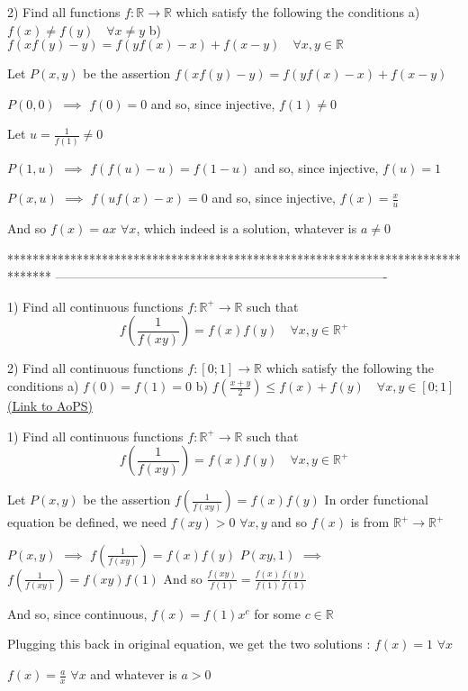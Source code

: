 \begin{solution}
	\begin{tcolorbox}2)  Find all functions $f:\mathbb{R}\to\mathbb{R}$  which satisfy the following the conditions 
a) $f(x)\neq f(y) \quad \forall x\neq y$
b) $f(xf(y)-y)=f(yf(x)-x)+f(x-y) \quad \forall x,y \in \mathbb{R}$\end{tcolorbox}
Let $P(x,y)$ be the assertion $f(xf(y)-y)=f(yf(x)-x)+f(x-y)$

$P(0,0)$ $\implies$ $f(0)=0$ and so, since injective, $f(1)\ne 0$

Let $u=\frac 1{f(1)}\ne 0$

$P(1,u)$ $\implies$ $f(f(u)-u)=f(1-u)$ and so, since injective, $f(u)=1$

$P(x,u)$ $\implies$ $f(uf(x)-x)=0$ and so, since injective, $f(x)=\frac xu$

And so $\boxed{f(x)=ax}$ $\forall x$, which indeed is a solution, whatever is $a\ne 0$
\end{solution}
*******************************************************************************
-------------------------------------------------------------------------------

\begin{problem}
	1) Find all continuous functions $f:\mathbb{R}^+\to\mathbb{R}$  such that
\[f\left(\frac{1}{f(xy)}\right) =f(x)f(y) \quad \forall x,y \in \mathbb{R}^+\]

2) Find all continuous functions $f:[0;1]\to\mathbb{R}$  which satisfy the following the conditions
a) $f(0)=f(1)=0$
b) $f\left(\frac{x+y}{2} \right) \leq f(x)+f(y) \quad \forall x,y \in [0;1]$
	\flushright \href{https://artofproblemsolving.com/community/c6h563604}{(Link to AoPS)}
\end{problem}



\begin{solution}
	\begin{tcolorbox}1) Find all continuous functions $f:\mathbb{R}^+\to\mathbb{R}$  such that
\[f\left(\frac{1}{f(xy)}\right) =f(x)f(y) \quad \forall x,y \in \mathbb{R}^+\]\end{tcolorbox}
Let $P(x,y)$ be the assertion $f(\frac 1{f(xy)})=f(x)f(y)$
In order functional equation be defined, we need $f(xy)> 0$ $\forall x,y$ and so $f(x)$ is from $\mathbb R^+\to\mathbb R^+$

$P(x,y)$ $\implies$ $f(\frac 1{f(xy)})=f(x)f(y)$
$P(xy,1)$ $\implies$ $f(\frac 1{f(xy)})=f(xy)f(1)$
And so $\frac{f(xy)}{f(1)}=\frac{f(x)}{f(1)}\frac{f(y)}{f(1)}$

And so, since continuous, $f(x)=f(1)x^c$ for some $c\in\mathbb R$

Plugging this back in original equation, we get the two solutions :
$\boxed{f(x)=1}$ $\forall x$

$\boxed{f(x)=\frac ax}$ $\forall x$ and whatever is $a>0$
\end{solution}



